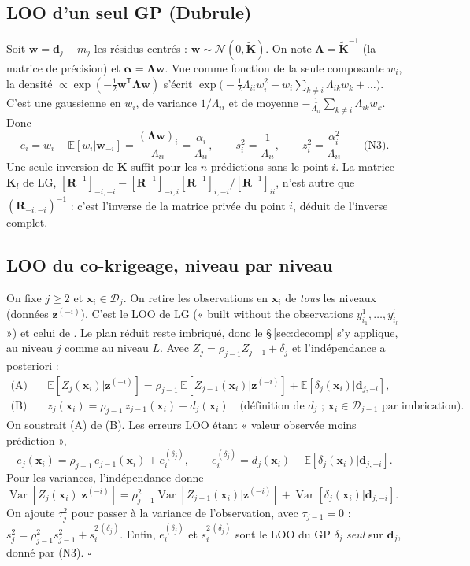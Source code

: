 \documentclass[10pt,a4paper]{article}
\newcommand{\vx}{\bm{x}}
\newcommand{\vz}{\bm{z}}
\newcommand{\vd}{\bm{d}}
\newcommand{\vw}{\bm{w}}
\newcommand{\Kt}{\widetilde{\bm{K}}}
\newcommand{\Lam}{\bm{\Lambda}}
\newcommand{\D}{\mathcal{D}}
\newcommand{\tp}{^{\mathsf{T}}}
\DeclareMathOperator{\Var}{Var}
\begin{document}
\subsection{LOO d'un seul GP (Dubrule)}
Soit $\vw=\vd_j-m_j$ les résidus centrés : $\vw\sim\mathcal{N}(0,\Kt)$. On note $\Lam=\Kt^{-1}$ (la matrice
de précision) et $\bm{\alpha}=\Lam\vw$. Vue comme fonction de la seule composante $w_i$, la densité
$\propto\exp(-\tfrac12\vw\tp\Lam\vw)$ s'écrit
$\exp\!\big(-\tfrac12\Lambda_{ii}w_i^2-w_i\sum_{k\ne i}\Lambda_{ik}w_k+\dots\big)$. C'est une gaussienne en
$w_i$, de variance $1/\Lambda_{ii}$ et de moyenne $-\frac{1}{\Lambda_{ii}}\sum_{k\ne i}\Lambda_{ik}w_k$. Donc
\[
  e_i=w_i-\mathbb{E}[w_i|\vw_{-i}]=\frac{(\Lam\vw)_i}{\Lambda_{ii}}=\frac{\alpha_i}{\Lambda_{ii}},\qquad
  s_i^2=\frac{1}{\Lambda_{ii}},\qquad z_i^2=\frac{\alpha_i^2}{\Lambda_{ii}}\qquad\text{(N3)}.
\]
Une seule inversion de $\Kt$ suffit pour les $n$ prédictions sans le point $i$. La matrice $\mathbf{K}_l$
de LG, $[\mathbf{R}^{-1}]_{-i,-i}-[\mathbf{R}^{-1}]_{-i,i}[\mathbf{R}^{-1}]_{i,-i}/[\mathbf{R}^{-1}]_{ii}$,
n'est autre que $(\mathbf{R}_{-i,-i})^{-1}$ : c'est l'inverse de la matrice privée du point $i$, déduit de
l'inverse complet.

\subsection{LOO du co-krigeage, niveau par niveau}
On fixe $j\ge2$ et $\vx_i\in\D_j$. On retire les observations en $\vx_i$ de \emph{tous} les niveaux (données
$\vz^{(-i)}$). C'est le LOO de LG (« built without the observations $y^1_{i_1},\dots,y^l_{i_l}$ ») et celui de
. Le plan réduit reste imbriqué, donc le §\,\ref{sec:decomp} s'y
applique, au niveau $j$ comme au niveau $L$. Avec $Z_j=\rho_{j-1}Z_{j-1}+\delta_j$ et l'indépendance a
posteriori :
\begin{align*}
  \text{(A)}\quad & \mathbb{E}[Z_j(\vx_i)|\vz^{(-i)}]=\rho_{j-1}\,\mathbb{E}[Z_{j-1}(\vx_i)|\vz^{(-i)}]
                    +\mathbb{E}[\delta_j(\vx_i)|\vd_{j,-i}],\\
  \text{(B)}\quad & z_j(\vx_i)=\rho_{j-1}\,z_{j-1}(\vx_i)+d_j(\vx_i)
                    \quad\text{(définition de $d_j$ ; $\vx_i\in\D_{j-1}$ par imbrication).}
\end{align*}
On soustrait (A) de (B). Les erreurs LOO étant « valeur observée moins prédiction »,
\[
  e_j(\vx_i)=\rho_{j-1}\,e_{j-1}(\vx_i)+e_i^{(\delta_j)},\qquad
  e_i^{(\delta_j)}=d_j(\vx_i)-\mathbb{E}[\delta_j(\vx_i)|\vd_{j,-i}] .
\]
Pour les variances, l'indépendance donne
$\Var[Z_j(\vx_i)|\vz^{(-i)}]=\rho_{j-1}^2\Var[Z_{j-1}(\vx_i)|\vz^{(-i)}]+\Var[\delta_j(\vx_i)|\vd_{j,-i}]$.
On ajoute $\tau_j^2$ pour passer à la variance de l'observation, avec $\tau_{j-1}=0$ :
$s_j^2=\rho_{j-1}^2s_{j-1}^2+s_i^{2\,(\delta_j)}$. Enfin, $e_i^{(\delta_j)}$ et $s_i^{2\,(\delta_j)}$ sont le
LOO du GP $\delta_j$ \emph{seul} sur $\vd_j$, donné par (N3). \hfill$\square$
\end{document}
